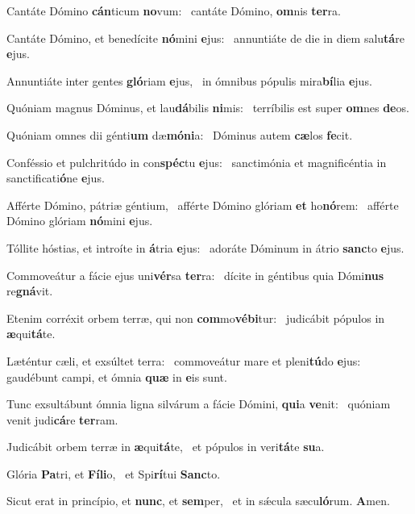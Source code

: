 \item Cantáte Dómino \textbf{cán}ticum \textbf{no}vum:~\psstar{} cantáte Dómino, \textbf{om}nis \textbf{ter}ra.
\item Cantáte Dómino, et benedícite \textbf{nó}mini \textbf{e}jus:~\psstar{} annuntiáte de die in diem salu\textbf{tá}re \textbf{e}jus.
\item Annuntiáte inter gentes \textbf{gló}riam \textbf{e}jus,~\psstar{} in ómnibus pópulis mira\textbf{bí}lia \textbf{e}jus.
\item Quóniam magnus Dóminus, et lau\textbf{dá}bilis \textbf{ni}mis:~\psstar{} terríbilis est super \textbf{om}nes \textbf{de}os.
\item Quóniam omnes dii génti\textbf{um} dæ\textbf{mó}\textbf{ni}a:~\psstar{} Dóminus autem \textbf{cæ}los \textbf{fe}cit.
\item Conféssio et pulchritúdo in con\textbf{spéc}tu \textbf{e}jus:~\psstar{} sanctimónia et magnificéntia in sanctificati\textbf{ó}ne \textbf{e}jus.
\item Afférte Dómino, pátriæ géntium,~\pscross{} afférte Dómino glóriam \textbf{et} ho\textbf{nó}rem:~\psstar{} afférte Dómino glóriam \textbf{nó}mini \textbf{e}jus.
\item Tóllite hóstias, et introíte in \textbf{á}tria \textbf{e}jus:~\psstar{} adoráte Dóminum in átrio \textbf{sanc}to \textbf{e}jus.
\item Commoveátur a fácie ejus uni\textbf{vér}sa \textbf{ter}ra:~\psstar{} dícite in géntibus quia Dómi\textbf{nus} re\textbf{gná}vit.
\item Etenim corréxit orbem terræ, qui non \textbf{com}mo\textbf{vé}\textbf{bi}tur:~\psstar{} judicábit pópulos in \textbf{æ}qui\textbf{tá}te.
\item Læténtur cæli, et exsúltet terra:~\pscross{} commoveátur mare et pleni\textbf{tú}do \textbf{e}jus:~\psstar{} gaudébunt campi, et ómnia \textbf{quæ} in \textbf{e}is sunt.
\item Tunc exsultábunt ómnia ligna silvárum a fácie Dómini, \textbf{qui}a \textbf{ve}nit:~\psstar{} quóniam venit judi\textbf{cá}re \textbf{ter}ram.
\item Judicábit orbem terræ in \textbf{æ}qui\textbf{tá}te,~\psstar{} et pópulos in veri\textbf{tá}te \textbf{su}a.
\item Glória \textbf{Pa}tri, et \textbf{Fí}\textbf{li}o,~\psstar{} et Spi\textbf{rí}tui \textbf{Sanc}to.
\item Sicut erat in princípio, et \textbf{nunc}, et \textbf{sem}per,~\psstar{} et in sǽcula sæcu\textbf{ló}rum. \textbf{A}men.